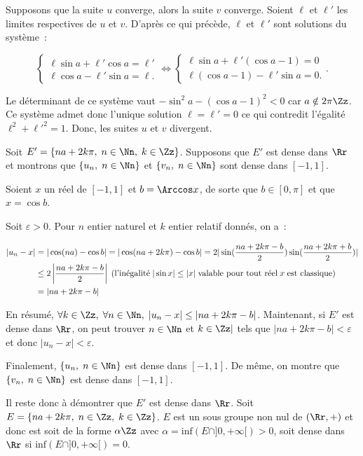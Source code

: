 {\begin{enumerate}
{Supposons que la suite $u$ converge, alors la suite $v$ converge. Soient $\ell$ et $\ell'$ les limites respectives de $u$ et $v$. D'après ce qui précède, $\ell$ et $\ell'$ sont solutions du système~:
 
$$\left\{
\begin{array}{l}
\ell\sin a+\ell'\cos a=\ell'\\
\ell\cos a-\ell'\sin a=\ell.
\end{array}
\right.\Leftrightarrow\left\{
\begin{array}{l}
\ell\sin a+\ell'(\cos a-1)=0\\
\ell(\cos a-1)-\ell'\sin a=0.
\end{array}
\right..$$

Le déterminant de ce système vaut $-\sin^2a-(\cos a-1)^2<0$ car $a\notin2\pi\Zz$. Ce système admet donc l'unique solution $\ell=\ell'=0$ ce qui contredit l'égalité $\ell^2+{\ell'}^2=1$. Donc, les suites $u$ et $v$ divergent.
\begin{enumerate}
Soit $E'=\{na+2k\pi,\;n\in\Nn,\;k\in\Zz\}$. Supposons que $E'$ est dense dans $\Rr$ et montrons que $\{u_n,\;n\in\Nn\}$ et $\{v_n,\;n\in\Nn\}$ sont dense dans $[-1,1]$.

Soient $x$ un réel de $[-1,1]$ et $b=\Arccos x$, de sorte que $b\in[0,\pi]$ et que $x=\cos b$.

Soit $\varepsilon>0$. Pour $n$ entier naturel et $k$ entier relatif donnés, on a~:

\begin{align*}\ensuremath
|u_n-x|&=|\cos(na)-\cos b|=|\cos(na+2k\pi)-\cos b|=2|\sin(\frac{na+2k\pi-b}{2})\sin(\frac{na+2k\pi+b}{2})|\\
 &\leq2\left|\frac{na+2k\pi-b}{2}\right|\;(\mbox{l'inégalité}\;|\sin x|\leq|x|\;\mbox{valable pour tout réel}\;x\;\mbox{est classique})\\
 &=|na+2k\pi-b|
\end{align*}

En résumé, $\forall k\in\Zz,\;\forall n\in\Nn,\;|u_n-x|\leq|na+2k\pi-b|$. Maintenant, si $E'$ est dense dans $\Rr$, on peut trouver $n\in\Nn$ et $k\in\Zz|$ tels que $|na+2k\pi-b|<\varepsilon$ et donc $|u_n-x|<\varepsilon$.

Finalement, $\{u_n,\;n\in\Nn\}$ est dense dans $[-1,1]$. De même, on montre que $\{v_n,\;n\in\Nn\}$ est dense dans $[-1,1]$.

Il reste donc à démontrer que $E'$ est dense dans $\Rr$.
Soit $E=\{na+2k\pi,\;n\in\Zz,\;k\in\Zz\}$. $E$ est un sous groupe non nul de $(\Rr,+)$ et donc est soit de la forme $\alpha\Zz$ avec $\alpha=\mbox{inf}(E\cap]0,+\infty[)>0$, soit dense dans $\Rr$ si $\mbox{inf}(E\cap]0,+\infty[)=0$.


\end{enumerate}}
\end{enumerate}}
